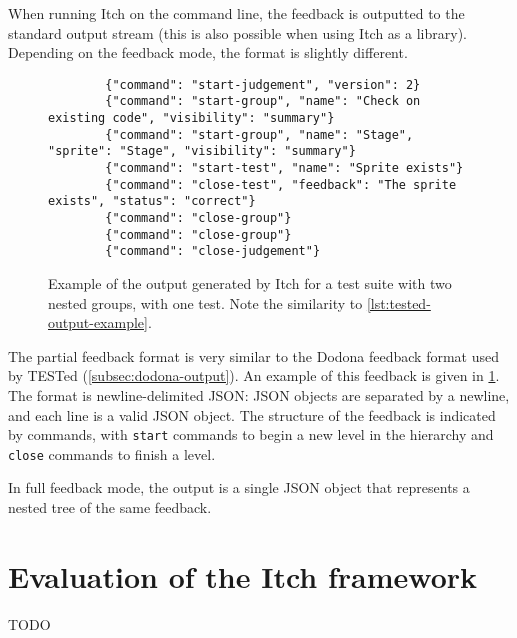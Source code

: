\documentclass[../main]{subfiles}
\begin{document}
When running Itch on the command line, the feedback is outputted to the standard output stream (this is also possible when using Itch as a library).
Depending on the feedback mode, the format is slightly different.

\begin{figure}
    \begin{verbatim}
        {"command": "start-judgement", "version": 2}
        {"command": "start-group", "name": "Check on existing code", "visibility": "summary"}
        {"command": "start-group", "name": "Stage", "sprite": "Stage", "visibility": "summary"}
        {"command": "start-test", "name": "Sprite exists"}
        {"command": "close-test", "feedback": "The sprite exists", "status": "correct"}
        {"command": "close-group"}
        {"command": "close-group"}
        {"command": "close-judgement"}
    \end{verbatim}
    \caption{Example of the output generated by Itch for a test suite with two nested groups, with one test. Note the similarity to \cref{lst:tested-output-example}.}\label{lst:itch-output-example-partial}
\end{figure}

The partial feedback format is very similar to the Dodona feedback format used by TESTed (\cref{subsec:dodona-output}).
An example of this feedback is given in \cref{lst:itch-output-example-partial}.
The format is newline-delimited JSON: JSON objects are separated by a newline, and each line is a valid JSON object.
The structure of the feedback is indicated by commands, with \texttt{start} commands to begin a new level in the hierarchy and \texttt{close} commands to finish a level.

In full feedback mode, the output is a single JSON object that represents a nested tree of the same feedback.

\section{Evaluation of the Itch framework}\label{sec:itch-evaluation}

TODO
\end{document}
